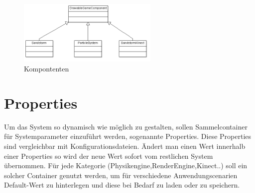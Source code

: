 \begin{Spacing}{\mylinespace}
\begin{figure}[h!]
	\centering
	\vspace*{20px}
	\includegraphics[width=0.6\textwidth]{graphics/DrawableGame.png}
	\caption{Kompontenten}
	\label{fig:singleColor}
\end{figure}

\section{Properties}
Um das  System so dynamisch wie möglich zu gestalten, sollen Sammelcontainer für Systemparameter einzuführt werden, sogenannte Properties.
Diese Properties sind vergleichbar mit Konfigurationsdateien. Ändert man einen Wert innerhalb einer Properties so wird der neue Wert sofort vom restlichen System übernommen. Für jede Kategorie (Physikengine,RenderEngine,Kinect..) soll ein solcher Container genutzt werden, um für verschiedene Anwendungscenarien Default-Wert zu hinterlegen und diese bei Bedarf zu laden oder zu speichern.

\end{Spacing}
\newpage
\clearpage
